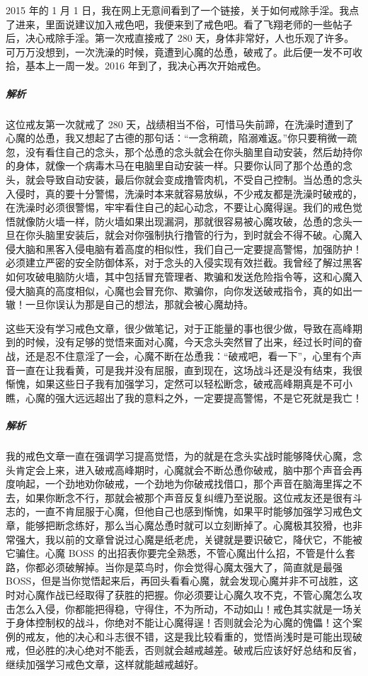 \begin{case}[研究心魔的特点]
    2015 年的 1 月 1 日，我在网上无意间看到了一个链接，关于如何戒除手淫。我点了进来，里面说建议加入戒色吧，我便来到了戒色吧。看了飞翔老师的一些帖子后，决心戒除手淫。第一次戒直接戒了 280 天，身体非常好，人也乐观了许多。可万万没想到，一次洗澡的时候，竟遭到心魔的怂恿，破戒了。此后便一发不可收拾，基本上一周一发。2016 年到了，我决心再次开始戒色。
    \subparagraph{解析} 这位戒友第一次就戒了 280 天，战绩相当不俗，可惜马失前蹄，在洗澡时遭到了心魔的怂恿，我又想起了古德的那句话：“一念稍疏，陷溺难返。”你只要稍微一疏忽，没有看住自己的念头，那个怂恿的念头就会在你头脑里自动安装，然后劫持你的身体，就像一个病毒木马在电脑里自动安装一样。只要你认同了那个怂恿的念头，就会导致自动安装，最后你就会变成撸管肉机，不受自己控制。当怂恿的念头入侵时，真的要十分警惕，洗澡时本来就容易放纵，不少戒友都是洗澡时破戒的，在洗澡时必须很警惕，牢牢看住自己的起心动念，不要让心魔得逞。我们的戒色觉悟就像防火墙一样，防火墙如果出现漏洞，那就很容易被心魔攻破，怂恿的念头一旦在你头脑里安装后，就会对你强制执行撸管的行为，到时就会不得不破。心魔入侵大脑和黑客入侵电脑有着高度的相似性，我们自己一定要提高警惕，加强防护！必须建立严密的安全防御体系，对于念头的入侵实现有效拦截。我曾经了解过黑客如何攻破电脑防火墙，其中包括冒充管理者、欺骗和发送危险指令等，这和心魔入侵大脑真的高度相似，心魔也会冒充你、欺骗你，向你发送破戒指令，真的如出一辙！一旦你误认为那是自己的想法，那就会被心魔劫持。
\end{case}

\begin{case}[研究心魔的特点]
    这些天没有学习戒色文章，很少做笔记，对于正能量的事也很少做，导致在高峰期到的时候，没有足够的觉悟来面对心魔，今天念头突然冒了出来，经过长时间的奋战，还是忍不住意淫了一会，心魔不断在怂恿我：“破戒吧，看一下”，心里有个声音一直在让我看黄，可是我并没有屈服，直到现在，这场战斗还是没有结束，我很惭愧，如果这些日子我有加强学习，定然可以轻松断念，破戒高峰期真是不可小瞧，心魔的强大远远超出了我的意料之外，一定要提高警惕，不是它死就是我亡！
    \subparagraph{解析} 我的戒色文章一直在强调学习提高觉悟，为的就是在念头实战时能够降伏心魔，念头肯定会上来，进入破戒高峰期时，心魔就会不断怂恿你破戒，脑中那个声音会再度响起，一个劲地劝你破戒，一个劲地为你破戒找借口，那个声音在脑海里挥之不去，如果你断念不行，那就会被那个声音反复纠缠乃至说服。这位戒友还是很有斗志的，一直不肯屈服于心魔，但他自己也感到惭愧，如果平时能够加强学习戒色文章，能够把断念练好，那么当心魔怂恿时就可以立刻断掉了。心魔极其狡猾，也非常强大，我以前的文章曾说过心魔是纸老虎，关键就是要识破它，降伏它，不能被它骗住。心魔 BOSS 的出招表你要完全熟悉，不管心魔出什么招，不管是什么套路，你都必须破解掉。当你是菜鸟时，你会觉得心魔太强大了，简直就是最强 BOSS，但是当你觉悟起来后，再回头看看心魔，就会发现心魔并非不可战胜，这时对心魔作战已经取得了获胜的把握。你必须要让心魔久攻不克，不管心魔怎么攻击怎么入侵，你都能把得稳，守得住，不为所动，不动如山！戒色其实就是一场关于身体控制权的战斗，你绝对不能让心魔得逞！否则就会沦为心魔的傀儡！这个案例的戒友，他的决心和斗志很不错，这是我比较看重的，觉悟尚浅时是可能出现破戒，但必胜的决心绝对不能丢，否则就会越戒越差。破戒后应该好好总结和反省，继续加强学习戒色文章，这样就能越戒越好。
\end{case}

